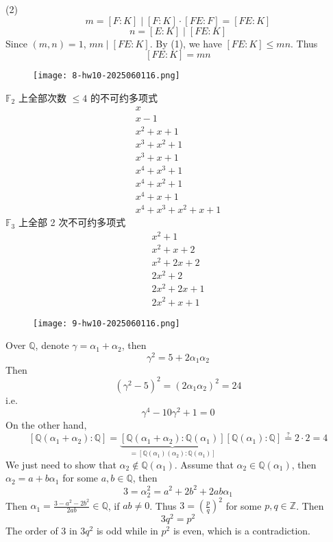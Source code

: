 (2)
\[
m=[F:K]\mid [F:K]\cdot[FE:F]=[FE:K]
\]
\[
n=[E:K]\mid [FE:K]
\]
Since $(m,n)=1$, $mn \mid[FE:K]$. By (1), we have $[FE:K]\leq mn$. Thus
\[
[FE:K]=mn
\]
\begin{exercise}
\begin{figure}[H]
\centering
\texttt{[image: 8-hw10-2025060116.png]}
\label{}
\end{figure}
\end{exercise}
$\mathbb{F}_{2}$ 上全部次数 $\leq4$ 的不可约多项式
\[
\begin{gathered}
x \\
x-1 \\
x^2+x+1 \\
x^3+x^2+1 \\
x^3+x+ 1 \\
x^{4}+x^3+1 \\
x^{4}+x^2+1 \\
x^{4}+x+1 \\
x^{4}+x^3+x^2+x+1
\end{gathered}
\]
$\mathbb{F}_{3}$ 上全部 2 次不可约多项式
\[
\begin{gathered}
x^2+1  \\
x^2+x+2 \\
x^2+2x+2 \\
2x^2+2 \\
2x^2+2x+1 \\
2x^2+x+1
\end{gathered}
\]
\begin{exercise}
\begin{figure}[H]
\centering
\texttt{[image: 9-hw10-2025060116.png]}
\label{}
\end{figure}
\end{exercise}
Over $\mathbb{Q}$, denote $\gamma=\alpha_1+\alpha_2$, then
\[
\gamma^{2}=5+2\alpha_1\alpha_2
\]
Then
\[
(\gamma^{2}-5)^2=(2\alpha_1\alpha_2)^2=24
\]
i.e.
\[
\gamma^{4}-10\gamma^{2}+1=0
\]
On the other hand,
\[
[\mathbb{Q}(\alpha_1+\alpha_2):\mathbb{Q}]=\underbrace{ [\mathbb{Q}(\alpha_1+\alpha_2):\mathbb{Q}(\alpha_1)] }_{ =[\mathbb{Q}(\alpha_1)(\alpha_2):\mathbb{Q}(\alpha_1)] }[\mathbb{Q}(\alpha_1):\mathbb{Q}]\overset{ ? }{ = }2\cdot2=4
\]
We just need to show that $\alpha_2 \not\in \mathbb{Q}(\alpha_1)$. Assume that $\alpha_2\in \mathbb{Q}(\alpha_1)$, then $\alpha_2=a+b\alpha_1$ for some $a, b\in \mathbb{Q}$, then
\[
3=\alpha_2^2=a^2+2b^2+2ab\alpha_1
\]
Then $\alpha_1=\frac{3-a^2-2b^2}{2ab}\in \mathbb{Q}$, if $ab\neq0$. Thus $3=\left( \frac{p}{q} \right)^2$ for some $p, q\in \mathbb{Z}$. Then
\[
3q^2=p^2
\]
The order of 3 in $3q^2$ is odd while in $p^2$ is even, which is a contradiction.

